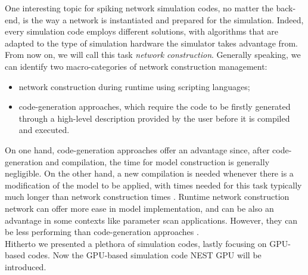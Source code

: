 \documentclass[a4paper, 12pt, twoside, openright]{book}
\begin{document}
One interesting topic for spiking network simulation codes, no matter the back-end, is the way a network is instantiated and prepared for the simulation. Indeed, every simulation code employs different solutions, with algorithms that are adapted to the type of simulation hardware the simulator takes advantage from. From now on, we will call this task \textit{network construction}. Generally speaking, we can identify two macro-categories of network construction management:

\begin{itemize}
    \item network construction during runtime using scripting languages;
    \item code-generation approaches, which require the code to be firstly generated through a high-level description provided by the user before it is compiled and executed.
\end{itemize}

On one hand, code-generation approaches offer an advantage since, after code-generation and compilation, the time for model construction is generally negligible. On the other hand, a new compilation is needed whenever there is a modification of the model to be applied, with times needed for this task typically much longer than network construction times \cite{Golosio2020}. Runtime network construction network can offer more ease in model implementation, and can be also an advantage in some contexts like parameter scan applications. However, they can be less performing than code-generation approaches \cite{Golosio2021}.\\
Hitherto we presented a plethora of simulation codes, lastly focusing on GPU-based codes. Now the GPU-based simulation code NEST GPU will be introduced.
\end{document}
